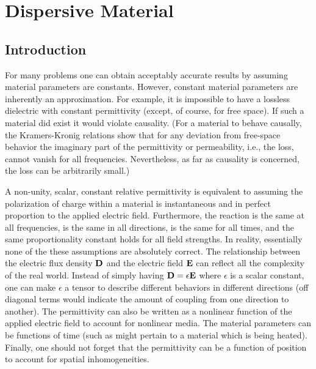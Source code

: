 \chapter{Dispersive Material \label{chap:dispersive}}


\renewcommand{\thefootnote}{\fnsymbol{footnote}}

\section{Introduction}

For many problems one can obtain acceptably accurate results
by assuming material parameters are constants.  However, constant
material parameters are inherently an approximation.  For example, it
is impossible to have a lossless dielectric with constant permittivity
(except, of course, for free space).  If such a material did exist it
would violate causality.  (For a material to behave causally, the
Kramers-Kronig relations show that for any deviation from free-space
behavior the imaginary part of the permittivity or permeability, i.e.,
the loss, cannot vanish for all frequencies.  Nevertheless, as far as
causality is concerned, the loss can be arbitrarily small.)

A non-unity, scalar, constant relative permittivity is equivalent to
assuming the polarization of charge within a material is instantaneous
and in perfect proportion to the applied electric field.  Furthermore,
the reaction is the same at all frequencies, is the same in all
directions, is the same for all times, and the same proportionality
constant holds for all field strengths.  In reality, essentially none
of the these assumptions are absolutely correct.  The relationship
between the electric flux density $\mathbf{D}$ and the electric field
$\mathbf{E}$ can reflect all the complexity of the real world.  Instead of
simply having $\mathbf{D}=\epsilon\mathbf{E}$ where $\epsilon$ is a scalar
constant, one can make $\epsilon$ a tensor to describe different
behaviors in different directions (off diagonal terms would indicate
the amount of coupling from one direction to another).  The
permittivity can also be written as a nonlinear function of the
applied electric field to account for nonlinear media.  The material
parameters can be functions of time (such as might pertain to a
material which is being heated).  Finally, one should not forget that
the permittivity can be a function of position to account for spatial
inhomogeneities.  

